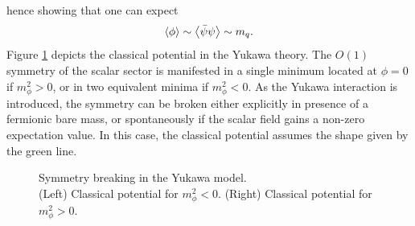 hence showing that one can expect
\begin{equation}
    \left\langle \phi \right\rangle \sim \left\langle \bar\psi\psi \right\rangle \sim m_q.
    \label{eq:qualitative_relation_condensate_magnetisation_mass}
\end{equation}
Figure \ref{fig:breaking_O1_symmetry} depicts the classical potential in the Yukawa theory. The $O(1)$ symmetry of the scalar sector is manifested in a single minimum located at $\phi = 0$ if $m_\phi^2 > 0$, or in two equivalent minima if $m_\phi^2 < 0$. As the Yukawa interaction is introduced, the symmetry can be broken either explicitly in presence of a fermionic bare mass, or spontaneously if the scalar field gains a non-zero expectation value. 
In this case, the classical potential assumes the shape given by the green line.
\begin{figure}
\centering
\begin{minipage}{0.45\textwidth}
\end{minipage}
\hfill
\begin{minipage}{0.45\textwidth}
\end{minipage}
\caption[Classical potential and symmetry breaking]{Symmetry breaking in the Yukawa model.\\ (Left) Classical potential for $m_\phi^2 < 0$. (Right) Classical potential for $m_\phi^2 > 0$.}
\label{fig:breaking_O1_symmetry}
\end{figure}